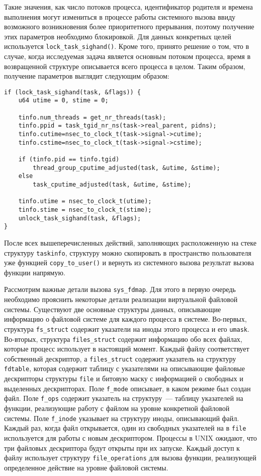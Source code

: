 Такие значения, как число потоков процесса, идентификатор родителя и времена
выполнения могут измениться в процессе работы системного вызова ввиду возможного
возникновения более приоритетного прерывания, поэтому получение этих параметров
необходимо блокировкой. Для данных конкретных целей используется
\texttt{lock\_task\_sighand()}. Кроме того, принято решение о том, что в случае,
когда исследуемая задача является основным потоком процесса, время в
возвращенной структуре описывается всего процесса в целом. Таким образом,
получение параметров выглядит следующим образом:
\medskip
\begin{lstlisting}[style=cstyle]
if (lock_task_sighand(task, &flags)) {
	u64 utime = 0, stime = 0;

	tinfo.num_threads = get_nr_threads(task);
	tinfo.ppid = task_tgid_nr_ns(task->real_parent, pidns);
	tinfo.cutime=nsec_to_clock_t(task->signal->cutime);
	tinfo.cstime=nsec_to_clock_t(task->signal->cstime);

	if (tinfo.pid == tinfo.tgid)
		thread_group_cputime_adjusted(task, &utime, &stime);
	else
		task_cputime_adjusted(task, &utime, &stime);

	tinfo.utime = nsec_to_clock_t(utime);
	tinfo.stime = nsec_to_clock_t(stime);
	unlock_task_sighand(task, &flags);
}
\end{lstlisting}
\medskip

После всех вышеперечисленных действий, заполняющих расположенную на стеке
структуру \texttt{taskinfo}, структуру можно скопировать в пространство
пользователя уже функцией \texttt{copy\_to\_user()} и вернуть из системного
вызова результат вызова функции напрямую.

Рассмотрим важные детали вызова \texttt{sys\_fdmap}. Для этого в первую очередь
необходимо прояснить некоторые детали реализации виртуальной файловой системы.
Существуют две основные структуры данных, описывающие информацию о файловой
системе для каждого процесса в системе. Во-первых, структура \texttt{fs\_struct}
содержит указатели на иноды этого процесса и его \texttt{umask}. Во-вторых,
структура \texttt{files\_struct} содержит информацию обо всех файлах, которые
процесс использует в настоящий момент. Каждый файлу соответствует собственный
дескриптор, а \texttt{files\_struct} содержит указатель на структуру
\texttt{fdtable}, которая содержит таблицу с указателями на описывающие файловые
дескрипторы структуры \texttt{file} и битовую маску с информацией о свободных и
выделенных дескрипторах. Поле \texttt{f\_mode} описывает, в каком режиме был
создан файл. Поле \texttt{f\_ops} содержит указатель на структуру~--- таблицу
указателей на функции, реализующие работу с файлом на уровне конкретной файловой
системы. Поле \texttt{f\_inode} указывает на структуру иноды, описывающий файл.
Каждый раз, когда файл открывается, один из свободных указателей на в
\texttt{file} используется для работы с новым дескриптором. Процессы в UNIX
ожидают, что три файловых дескриптора будут открыты при их запуске. Каждый
доступ к файлу использует структуру \texttt{file\_operations} для вызова
функции, реализующей определенное действие на уровне файловой системы.

